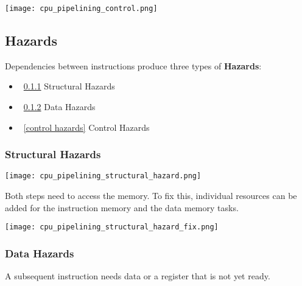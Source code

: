 \begin{multicols*}{2}
    \begin{center}
        \texttt{[image: cpu\_pipelining\_control.png]}
    \end{center}

    \subsection{Hazards}
    Dependencies between instructions produce three types of \textbf{Hazards}:
    \begin{itemize}
        \item~\ref{structural hazards} Structural Hazards
        \item~\ref{data hazards} Data Hazards
        \item~\ref{control hazards} Control Hazards
    \end{itemize}

    \subsubsection{Structural Hazards}\label{structural hazards}

    \texttt{[image: cpu\_pipelining\_structural\_hazard.png]}

    Both steps need to access the memory. To fix this, individual resources can be added for the instruction memory and the data memory tasks.

    \begin{center}
        \texttt{[image: cpu\_pipelining\_structural\_hazard\_fix.png]}
    \end{center}

    \subsubsection{Data Hazards}\label{data hazards}

    A subsequent instruction needs data or a register that is not yet ready.


\end{multicols*}
